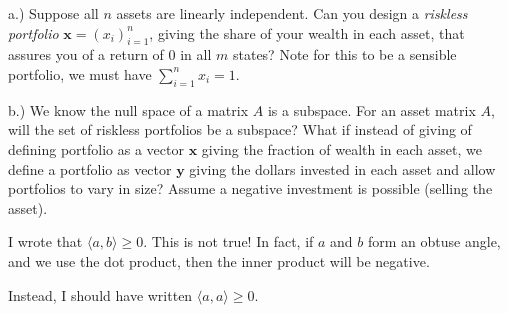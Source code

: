 \documentclass{article}
\begin{document}
\bigskip

a.) Suppose all $n$ assets are linearly independent. Can you design a \emph{riskless portfolio} $\mathbf{x}=\left( x_i \right)_{i=1}^n$, giving the share of your wealth in each asset, that assures you of a return of 0 in all $m$ states? Note for this to be a sensible portfolio, we must have $\sum_{i=1}^n x_i=1$. 

\bigskip{}

b.) We know the null space of a matrix $A$ is a subspace. For an asset matrix $A$, will the set of riskless portfolios be a subspace? What if instead of giving of defining portfolio as a vector $\mathbf{x}$ giving the fraction of wealth in each asset, we define a portfolio as vector $\mathbf{y}$ giving the dollars invested in each asset and allow portfolios to vary in size? Assume a negative investment is possible (selling the asset). 

\pagebreak

I wrote that $\langle a,b \rangle \geq 0$. This is not true! In fact, if $a$ and $b$ form an obtuse angle, and we use the dot product, then the inner product will be negative. 

Instead, I should have written $\langle a, a \rangle \geq 0$. 
\end{document}
